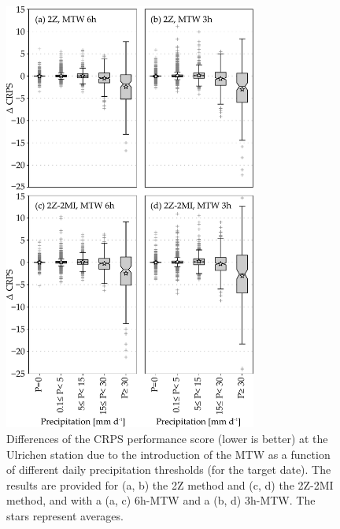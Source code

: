 \documentclass[hess, manuscript]{copernicus}
\begin{document}
	\begin{figure}[htb]
		\includegraphics[width=8.3cm]{fig11.pdf}
		\caption{Differences of the CRPS performance score (lower is better) at the Ulrichen station due to the introduction of the MTW as a function of different daily precipitation thresholds (for the target date). The results are provided for (a, b) the 2Z method and (c, d) the 2Z-2MI method, and with a (a, c) 6h-MTW and a (b, d) 3h-MTW. The stars represent averages.}
		\label{fig:changes_CRPS_precip_threshold}
	\end{figure}
	
\end{document}
